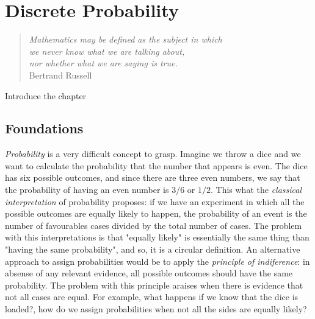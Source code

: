 %
%


\chapter{Discrete Probability}
\label{chap:Probability Theory}

\begin{quote}
\begin{flushright}
\emph{Mathematics may be defined as the subject in which\\
we never know what we are talking about,\\
nor whether what we are saying is true.}\\
Bertrand Russell
\end{flushright}
\end{quote}
\bigskip

{\color{red} Introduce the chapter}

%
%

\section{Foundations}
\label{sec:probability_foundations}

\emph{Probability} is a very difficult concept to grasp. Imagine we throw a dice and we want to calculate the probability that the number that appears is even. The dice has six possible outcomes, and since there are three even numbers, we say that the probability of having an even number is $3/6$ or $1/2$. This what the \emph{classical interpretation} of probability proposes: if we have an experiment in which all the possible outcomes are equally likely to happen, the probability of an event is the number of favourables cases divided by the total number of cases. The problem with this interpretations is that "equally likely" is essentially the same thing than "having the same probability", and so, it is a circular definition. An alternative approach to assign probabilities would be to apply the \emph{principle of indiference}: in absense of any relevant evidence, all possible outcomes should have the same probability. The problem with this principle araises when there is evidence that not all cases are equal. For example, what happens if we know that the dice is loaded?, how do we assign probabilities when not all the sides are equally likely?

